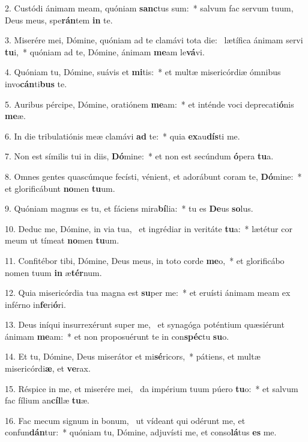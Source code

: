 2. Custódi ánimam meam, quóniam \textbf{sanc}tus sum:~*  salvum fac servum tuum, Deus meus, spe\textbf{rán}tem \textbf{in} te.\

3. Miserére mei, Dómine, quóniam ad te clamávi tota die: \dag\  lætífica ánimam servi \textbf{tu}i,~*  quóniam ad te, Dómine, ánimam \textbf{me}am le\textbf{vá}vi.\

4. Quóniam tu, Dómine, suávis et \textbf{mi}tis:~*  et multæ misericórdiæ ómnibus invo\textbf{cán}ti\textbf{bus} te.\

5. Auribus pércipe, Dómine, oratiónem \textbf{me}am:~*  et inténde voci deprecati\textbf{ó}nis \textbf{me}æ.\

6. In die tribulatiónis meæ clamávi \textbf{ad} te:~*  quia \textbf{ex}au\textbf{dís}ti me.\

7. Non est símilis tui in diis, \textbf{Dó}mine:~*  et non est secúndum \textbf{ó}pera \textbf{tu}a.\

8. Omnes gentes quascúmque fecísti, vénient, et adorábunt coram te, \textbf{Dó}mine:~*  et glorificábunt \textbf{no}men \textbf{tu}um.\

9. Quóniam magnus es tu, et fáciens mira\textbf{bí}lia:~*  tu es \textbf{De}us \textbf{so}lus.\

10. Deduc me, Dómine, in via tua, \dag\  et ingrédiar in veritáte \textbf{tu}a:~*  lætétur cor meum ut tímeat \textbf{no}men \textbf{tu}um.\

11. Confitébor tibi, Dómine, Deus meus, in toto corde \textbf{me}o,~*  et glorificábo nomen tuum \textbf{in} æ\textbf{tér}num.\

12. Quia misericórdia tua magna est \textbf{su}per me:~*  et eruísti ánimam meam ex inférno in\textbf{fe}ri\textbf{ó}ri.\

13. Deus iníqui insurrexérunt super me, \dag\  et synagóga poténtium quæsiérunt ánimam \textbf{me}am:~*  et non proposuérunt te in con\textbf{spéc}tu \textbf{su}o.\

14. Et tu, Dómine, Deus miserátor et mi\textbf{sé}ricors,~*  pátiens, et multæ misericórdi\textbf{æ}, et \textbf{ve}rax.\

15. Réspice in me, et miserére mei, \dag\  da impérium tuum púero \textbf{tu}o:~*  et salvum fac fílium an\textbf{cíl}læ \textbf{tu}æ.\

16. Fac mecum signum in bonum, \dag\  ut vídeant qui odérunt me, et confun\textbf{dán}tur:~*  quóniam tu, Dómine, adjuvísti me, et conso\textbf{lá}tus \textbf{es} me.\

